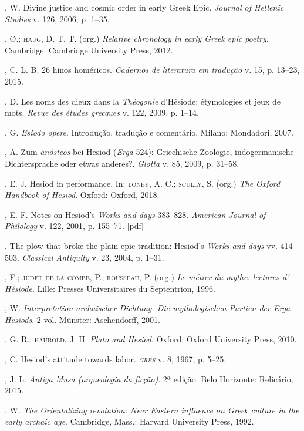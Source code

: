 \begin{bibliohedra}
, W. Divine justice and cosmic order in early Greek Epic.
\emph{Journal of Hellenic Studies} v. 126, 2006, p. 1--35.

, Ø.; \textsc{haug}, D. T. T. (org.) \emph{Relative chronology in early
Greek epic poetry}. Cambridge: Cambridge University Press, 2012.

, C. L. B. 26 hinos homéricos. \emph{Cadernos de literatura em
tradução} v. 15, p. 13--23, 2015.

, D. Les noms des dieux dans la \emph{Théogonie} d'Hésiode:
étymologies et jeux de mots. \emph{Revue des études grecques} v. 122,
2009, p. 1--14.

, G. \emph{Esiodo opere}. Introdução, tradução e comentário.
Milano: Mondadori, 2007.

, A. Zum \emph{anósteos} bei Hesiod (\emph{Erga} 524):
Griechische Zoologie, indogermanische Dichtersprache oder etwas
anderes?. \emph{Glotta} v. 85, 2009, p. 31--58.

, E. J. Hesiod in performance. In: \textsc{loney}, A. C.; \textsc{scully}, S. (org.) \emph{The Oxford Handbook of Hesiod}. Oxford: Oxford, 2018.

, E. F. Notes on Hesiod's \emph{Works and days} 383--828.
\emph{American Journal of Philology} v. 122, 2001, p. 155--71. {[}pdf{]}

\titidem. The plow that broke the plain epic tradition: Hesiod's \emph{Works
and days} vv. 414--503. \emph{Classical Antiquity} v. 23, 2004, p. 1--31.

, F.; \textsc{judet de la combe}, P.; \textsc{rousseau}, P. (org.) \emph{Le métier
du mythe: lectures d' Hésiode}. Lille: Presses Universitaires du
Septentrion, 1996.

, W. \emph{Interpretation archaischer Dichtung. Die mythologischen
Partien der Erga} \emph{Hesiods}. 2 vol. Münster: Aschendorff, 2001.

, G. R.; \textsc{haubold}, J. H. \emph{Plato and Hesiod}. Oxford:
Oxford University Press, 2010.

, C. Hesiod's attitude towards labor. \emph{\textsc{grbs}} v. 8,
1967, p. 5--25.

, J. L. \emph{Antiga Musa (arqueologia da ficção)}. 2ª edição.
Belo Horizonte: Relicário, 2015.

, W. \emph{The Orientalizing revolution: Near Eastern influence
on Greek culture in the early archaic age}. Cambridge, Mass.: Harvard
University Press, 1992.


\end{bibliohedra}
